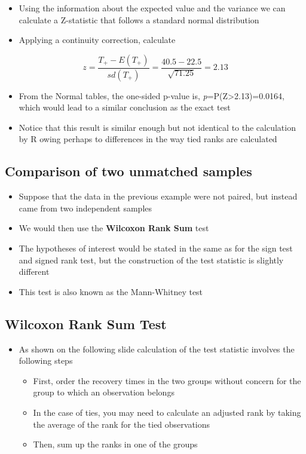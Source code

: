 \documentclass[
]{book}
\providecommand{\tightlist}{%
  \setlength{\itemsep}{0pt}\setlength{\parskip}{0pt}}
\begin{document}
\begin{itemize}
\tightlist
\item
  Using the information about the expected value and the variance we can calculate a Z-statistic that follows a standard normal distribution
\item
  Applying a continuity correction, calculate
\end{itemize}

\[z=\frac{T_+-E(T_+)}{sd(T_+)}=\frac{40.5-22.5}{\sqrt{71.25}}=2.13\]

\begin{itemize}
\tightlist
\item
  From the Normal tables, the one-sided p-value is, \emph{p}=P(Z\textgreater2.13)=0.0164, which would lead to a similar conclusion as the exact test
\item
  Notice that this result is similar enough but not identical to the calculation by R owing perhaps to differences in the way tied ranks are calculated
\end{itemize}

\hypertarget{comparison-of-two-unmatched-samples}{%
\subsection{Comparison of two unmatched samples}\label{comparison-of-two-unmatched-samples}}

\begin{itemize}
\tightlist
\item
  Suppose that the data in the previous example were not paired, but instead came from two independent samples
\item
  We would then use the \textbf{Wilcoxon Rank Sum} test
\item
  The hypotheses of interest would be stated in the same as for the sign test and signed rank test, but the construction of the test statistic is slightly different
\item
  This test is also known as the Mann-Whitney test
\end{itemize}

\hypertarget{wilcoxon-rank-sum-test}{%
\subsection{Wilcoxon Rank Sum Test}\label{wilcoxon-rank-sum-test}}

\begin{itemize}
\tightlist
\item
  As shown on the following slide calculation of the test statistic involves the following steps

  \begin{itemize}
  \tightlist
  \item
    First, order the recovery times in the two groups without concern for the group to which an observation belongs
  \item
    In the case of ties, you may need to calculate an adjusted rank by taking the average of the rank for the tied observations
  \item
    Then, sum up the ranks in one of the groups
  \end{itemize}
\end{itemize}
\end{document}
